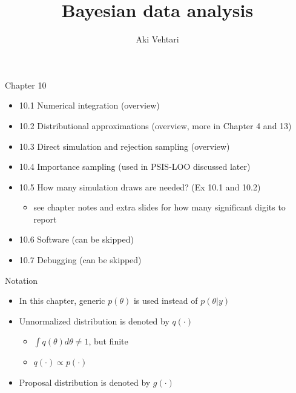 \documentclass[finnish,english,t]{beamer}
\title[]{Bayesian data analysis}
\subtitle{}
\author{Aki Vehtari}
\institute[Aalto]{}
\begin{document}
\begin{frame}{Chapter 10}

  \begin{itemize}
\item 10.1 Numerical integration (overview)
\item 10.2 Distributional approximations (overview, more in Chapter 4 and 13)
\item 10.3 Direct simulation and rejection sampling (overview)
\item 10.4 Importance sampling (used in PSIS-LOO discussed later)
\item 10.5 How many simulation draws are needed? (Ex 10.1 and 10.2)
  \begin{itemize}
  \item see chapter notes and extra slides for how many significant
    digits to report
  \end{itemize}
\item 10.6 Software (can be skipped)
\item 10.7 Debugging (can be skipped)
   \end{itemize}
\end{frame}

\begin{frame}{Notation}

  \begin{itemize}
  \item In this chapter, generic $p(\theta)$ is used instead of
    $p(\theta|y)$
  \item Unnormalized distribution is denoted by $q(\cdot)$
    \begin{itemize}
    \item $\int q(\theta) d\theta \neq 1$, but finite
    \item $q(\cdot) \propto p(\cdot)$
    \end{itemize}
  \item Proposal distribution is denoted by $g(\cdot)$
  \end{itemize}

\end{frame}
\end{document}
